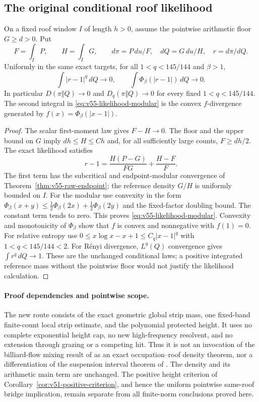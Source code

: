 \subsection{The original conditional roof likelihood}
\begin{theorem}
\label{thm:v55-endpoint-likelihood}
On a fixed roof window $I$ of length $h>0$, assume the pointwise
arithmetic floor $G\ge d>0$. Put
\[
 F=\int_I P,\qquad H=\int_I G,\qquad
 d\pi=P\,du/F,\quad dQ=G\,du/H,\quad r=d\pi/dQ.
\]
Uniformly in the same exact targets, for all $1<q<145/144$ and
$\beta>1$,
\begin{equation}\label{eq:v55-likelihood-modular}
 \int|r-1|^q\,dQ\longrightarrow0,\qquad
 \int\Phi_\beta(|r-1|)\,dQ\longrightarrow0.
\end{equation}
In particular $D(\pi\Vert Q)\to0$ and
$D_q(\pi\Vert Q)\to0$ for every fixed $1<q<145/144$.
The second integral in \eqref{eq:v55-likelihood-modular} is the
convex $f$-divergence generated by
$f(x)=\Phi_\beta(|x-1|)$.
\end{theorem}
\begin{proof}
The scalar first-moment law gives $F-H\to0$. The floor and the
upper bound on $G$ imply $dh\le H\le Ch$ and, for all sufficiently
large counts, $F\ge dh/2$. The exact likelihood satisfies
\[
 r-1=\frac{H(P-G)}{FG}+\frac{H-F}{F}.
\]
The first term has the subcritical and endpoint-modular convergence
of Theorem~\ref{thm:v55-raw-endpoint}; the reference density $G/H$
is uniformly bounded on $I$. For the modular use convexity in the
form $\Phi_\beta(x+y)\le\frac12\Phi_\beta(2x)+
\frac12\Phi_\beta(2y)$ and the fixed-factor doubling bound.
The constant term tends to zero. This proves
\eqref{eq:v55-likelihood-modular}. Convexity and monotonicity of
$\Phi_\beta$ show that $f$ is convex and nonnegative with $f(1)=0$.
For relative entropy use
$0\le x\log x-x+1\le C_q|x-1|^q$ with $1<q<145/144<2$.
For R\'enyi divergence, $L^q(Q)$ convergence gives
$\int r^q\,dQ\to1$. These are the unchanged conditional laws;
a positive integrated reference mass without the pointwise floor
would not justify the likelihood calculation.
\end{proof}

\paragraph{Proof dependencies and pointwise scope.}
The new route consists of the exact geometric global strip mass,
one fixed-band finite-count local strip estimate, and the polynomial
protected height. It uses no complete exponential height cap, no new
high-frequency resolvent, and no extension through grazing or a
competing hit. Thus it is not an invocation of the billiard-flow mixing
result of \cite{BDL} as an exact occupation--roof density theorem, nor
a differentiation of the suspension interval theorem of \cite{DN}.
The density and its arithmetic main term are unchanged. The positive
height criterion of Corollary~\ref{cor:v51-positive-criterion}, and
hence the uniform pointwise same-roof bridge implication, remain
separate from all finite-norm conclusions proved here.
